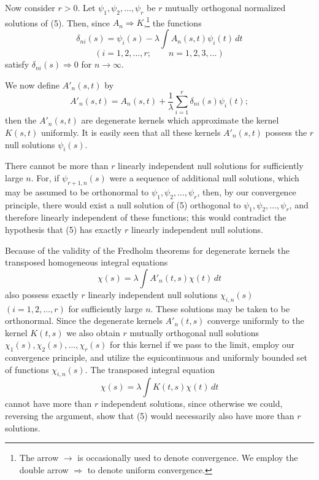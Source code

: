 Now consider $r>0$. Let $\psi_1,\psi_2,\ldots,\psi_r$ be $r$ mutually orthogonal normalized solutions of (5). Then, since $A_n\Rightarrow K$,\footnote{The arrow $\to$ is occasionally used to denote convergence. We employ the double arrow $\Rightarrow$ to denote uniform convergence.} the functions
\[
\delta_{ni}(s)=\psi_i(s)-\lambda\int A_n(s,t)\psi_i(t)\,dt
\]
\[
(i=1,2,\ldots,r;\qquad n=1,2,3,\ldots)
\]
satisfy $\delta_{ni}(s)\Rightarrow0$ for $n\to\infty$.

We now define $A'_n(s,t)$ by
\[
A'_n(s,t)=A_n(s,t)+\frac{1}{\lambda}\sum_{i=1}^{r}\delta_{ni}(s)\psi_i(t);
\]
then the $A'_n(s,t)$ are degenerate kernels which approximate the kernel $K(s,t)$ uniformly. It is easily seen that all these kernels $A'_n(s,t)$ possess the $r$ null solutions $\psi_i(s)$.

There cannot be more than $r$ linearly independent null solutions for sufficiently large $n$. For, if $\psi_{r+1,n}(s)$ were a sequence of additional null solutions, which may be assumed to be orthonormal to $\psi_1,\psi_2,\ldots,\psi_r$, then, by our convergence principle, there would exist a null solution of (5) orthogonal to $\psi_1,\psi_2,\ldots,\psi_r$, and therefore linearly independent of these functions; this would contradict the hypothesis that (5) has exactly $r$ linearly independent null solutions.

Because of the validity of the Fredholm theorems for degenerate kernels the transposed homogeneous integral equations
\begin{equation}\tag{19}
\chi(s)=\lambda\int A'_n(t,s)\chi(t)\,dt
\end{equation}
also possess exactly $r$ linearly independent null solutions $\chi_{i,n}(s)$ $(i=1,2,\ldots,r)$ for sufficiently large $n$. These solutions may be taken to be orthonormal. Since the degenerate kernels $A'_n(t,s)$ converge uniformly to the kernel $K(t,s)$ we also obtain $r$ mutually orthogonal null solutions $\chi_1(s),\chi_2(s),\ldots,\chi_r(s)$ for this kernel if we pass to the limit, employ our convergence principle, and utilize the equicontinuous and uniformly bounded set of functions $\chi_{i,n}(s)$. The transposed integral equation
\begin{equation}\tag{20}
\chi(s)=\lambda\int K(t,s)\chi(t)\,dt
\end{equation}
cannot have more than $r$ independent solutions, since otherwise we could, reversing the argument, show that (5) would necessarily also have more than $r$ solutions.

